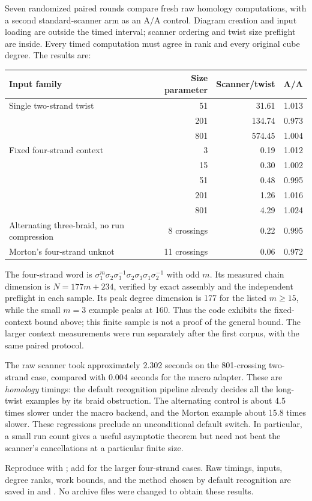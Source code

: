 Seven randomized paired rounds compare fresh raw homology computations,
with a second standard-scanner arm as an A/A control. Diagram creation
and input loading are outside the timed interval; scanner ordering and
twist size preflight are inside. Every timed computation must agree in
rank and every original cube degree. The results are:
\begin{center}
\begin{tabular}{lrrr}
\toprule
Input family & Size parameter & Scanner/twist & A/A\\
\midrule
Single two-strand twist & 51 & 31.61 & 1.013\\
 & 201 & 134.74 & 0.973\\
 & 801 & 574.45 & 1.004\\
Fixed four-strand context & 3 & 0.19 & 1.012\\
 & 15 & 0.30 & 1.002\\
 & 51 & 0.48 & 0.995\\
 & 201 & 1.26 & 1.016\\
 & 801 & 4.29 & 1.024\\
Alternating three-braid, no run compression & 8 crossings & 0.22 & 0.995\\
Morton's four-strand unknot & 11 crossings & 0.06 & 0.972\\
\bottomrule
\end{tabular}
\end{center}
The four-strand word is
$\sigma_1^m\sigma_2\sigma_3^{-1}\sigma_2\sigma_3\sigma_1\sigma_2^{-1}$
with odd $m$. Its measured chain dimension is $N=177m+234$,
verified by exact assembly and the independent preflight in each sample.
Its peak degree dimension is 177 for the listed $m\ge15$, while the
small $m=3$ example peaks at 160. Thus the code exhibits the fixed-context
bound above; this finite sample is not a proof of the general bound.
The larger context measurements were run separately after the first
corpus, with the same paired protocol.

The raw scanner took approximately 2.302 seconds on the 801-crossing
two-strand case, compared with 0.004 seconds for the macro adapter.
These are \emph{homology} timings: the default recognition pipeline
already decides all the long-twist examples by its braid obstruction.
The alternating control is about 4.5 times slower under the macro
backend, and the Morton example about 15.8 times slower. These regressions
preclude an unconditional default switch. In particular, a small run
count gives a useful asymptotic theorem but need not beat the scanner's
cancellations at a particular finite size.

Reproduce with ; add
 for the larger four-strand cases. Raw timings,
inputs, degree ranks, work bounds, and the method chosen by default
recognition are saved in
 and
.
No archive files were changed to obtain these results.
